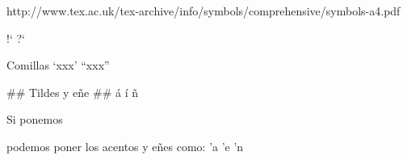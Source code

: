 http://www.tex.ac.uk/tex-archive/info/symbols/comprehensive/symbols-a4.pdf

\textexclamdown %
!` %
\textquestiondown %
?` %

\geneuro %

Comillas
`xxx' %
``xxx'' %

## Tildes y eñe ##
\'a %
\'i %
\~n %

Si ponemos 
\usepackage[spanish,activeacute]{babel}
podemos poner los acentos y eñes como:
'a
'e
'n
